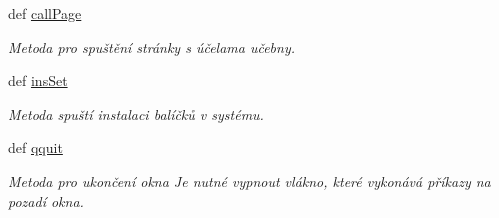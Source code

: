 \begin{DoxyCompactItemize}
def \hyperlink{classmnFocus_1_1App_aee9420a407130cec034afb6d5c32278c}{call\-Page}
\begin{DoxyCompactList}\small\item\em Metoda pro spuštění stránky s účelama učebny. \end{DoxyCompactList}\item 
def \hyperlink{classmnFocus_1_1App_a2ad6e7b25e3ebd9dbf284a5046ed22d0}{ins\-Set}
\begin{DoxyCompactList}\small\item\em Metoda spuští instalaci balíčků v systému. \end{DoxyCompactList}\item 
def \hyperlink{classmnFocus_1_1App_af8116e51713d83edb9b3d91cf4449329}{qquit}
\begin{DoxyCompactList}\small\item\em Metoda pro ukončení okna Je nutné vypnout vlákno, které vykonává příkazy na pozadí okna. \end{DoxyCompactList}\end{DoxyCompactItemize}
